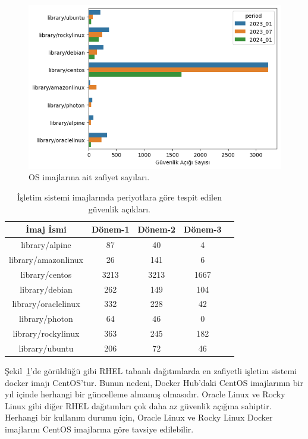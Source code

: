 \begin{figure}
    \centering
    \includegraphics[width=1\linewidth]{images/s2/os-images-by-period.png}
    \caption{OS imajlarına ait zafiyet sayıları.}\label{fig:os-images-by-period}
\end{figure}

\begin{table}
    \caption{İşletim sistemi imajlarında periyotlara göre tespit edilen güvenlik açıkları.}\label{tab:os-images-by-period}
    \centering
    \begin{tabular}{ |c|c|c|c|c| }
        \hline
        İmaj İsmi & Dönem-1 & Dönem-2 & Dönem-3 \\
        \hline
        library/alpine      &   87 &   40 & 4 \\
        library/amazonlinux &   26 &  141 & 6 \\
        library/centos      & 3213 & 3213 & 1667 \\
        library/debian      &  262 &  149 & 104 \\
        library/oraclelinux &  332 &  228 & 42 \\
        library/photon      &   64 &   46 & 0 \\
        library/rockylinux  &  363 &  245 & 182 \\
        library/ubuntu      &  206 &   72 & 46 \\
        \hline
    \end{tabular}
\end{table}

Şekil~\ref{fig:os-images-by-period}'de görüldüğü gibi RHEL tabanlı dağıtımlarda en zafiyetli işletim sistemi docker imajı CentOS'tur. Bunun nedeni, Docker Hub'daki CentOS imajlarının bir yıl içinde herhangi bir güncelleme almamış olmasıdır. Oracle Linux ve Rocky Linux gibi diğer RHEL dağıtımları çok daha az güvenlik açığına sahiptir. Herhangi bir kullanım durumu için, Oracle Linux ve Rocky Linux Docker imajlarını CentOS imajlarına göre tavsiye edilebilir.

